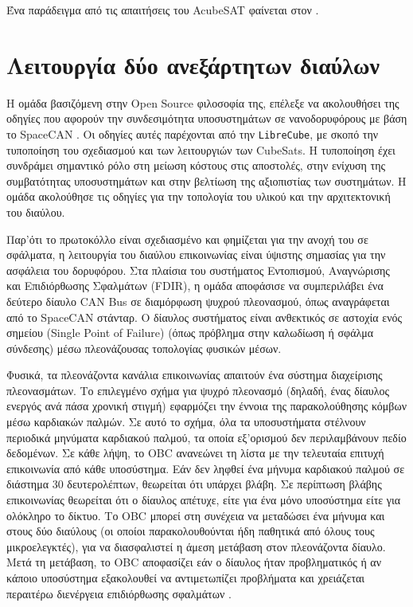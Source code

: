 \documentclass[a4paper,nobib,justified]{tufte-book}
\begin{document}
Ένα παράδειγμα από τις απαιτήσεις του AcubeSAT φαίνεται στον .

\section{Λειτουργία δύο ανεξάρτητων διαύλων}
Η ομάδα βασιζόμενη στην Open Source φιλοσοφία της, επέλεξε να ακολουθήσει της οδηγίες που αφορούν την συνδεσιμότητα υποσυστημάτων σε νανοδορυφόρους με βάση το SpaceCAN . Οι οδηγίες αυτές παρέχονται από την \texttt{LibreCube}, με σκοπό την τυποποίηση του σχεδιασμού και των λειτουργιών των CubeSats. Η τυποποίηση έχει συνδράμει σημαντικό ρόλο στη μείωση κόστους στις αποστολές, στην ενίχυση της συμβατότητας υποσυστημάτων και στην βελτίωση της αξιοπιστίας των συστημάτων. Η ομάδα ακολούθησε τις οδηγίες για την τοπολογία του υλικού και την αρχιτεκτονική του διαύλου.

Παρ'ότι το πρωτοκόλλο είναι σχεδιασμένο και φημίζεται για την ανοχή του σε σφάλματα, η λειτουργία του διαύλου επικοινωνίας είναι ύψιστης σημασίας για την ασφάλεια του δορυφόρου. Στα πλαίσια του συστήματος Εντοπισμού, Αναγνώρισης και Επιδιόρθωσης Σφαλμάτων (FDIR), η ομάδα αποφάσισε να συμπεριλάβει ένα δεύτερο δίαυλο CAN Bus σε διαμόρφωση ψυχρού πλεονασμού, όπως αναγράφεται από το SpaceCAN  στάνταρ. Ο δίαυλος συστήματος είναι ανθεκτικός σε αστοχία ενός σημείου (Single Point of Failure) (όπως πρόβλημα στην καλωδίωση ή σφάλμα σύνδεσης) μέσω πλεονάζουσας τοπολογίας φυσικών μέσων. 

Φυσικά, τα πλεονάζοντα κανάλια επικοινωνίας απαιτούν ένα σύστημα διαχείρισης πλεονασμάτων. Το επιλεγμένο σχήμα για ψυχρό πλεονασμό (δηλαδή, ένας δίαυλος ενεργός ανά πάσα χρονική στιγμή) εφαρμόζει την έννοια της παρακολούθησης κόμβων μέσω καρδιακών παλμών. Σε αυτό το σχήμα, όλα τα υποσυστήματα στέλνουν περιοδικά μηνύματα καρδιακού παλμού, τα οποία εξ'ορισμού δεν περιλαμβάνουν πεδίο δεδομένων. Σε κάθε λήψη, το OBC ανανεώνει τη λίστα με την τελευταία επιτυχή επικοινωνία από κάθε υποσύστημα. Εάν δεν ληφθεί ένα μήνυμα καρδιακού παλμού σε διάστημα 30 δευτερολέπτων, θεωρείται ότι υπάρχει βλάβη. Σε περίπτωση βλάβης επικοινωνίας θεωρείται ότι ο δίαυλος απέτυχε, είτε για ένα μόνο υποσύστημα είτε για ολόκληρο το δίκτυο. Το OBC μπορεί στη συνέχεια να μεταδώσει ένα μήνυμα και στους δύο διαύλους (οι οποίοι παρακολουθούνται ήδη παθητικά από όλους τους μικροελεγκτές), για να διασφαλιστεί η άμεση μετάβαση στον πλεονάζοντα δίαυλο. Μετά τη μετάβαση, το OBC αποφασίζει εάν ο δίαυλος ήταν προβληματικός ή αν κάποιο υποσύστημα εξακολουθεί να αντιμετωπίζει προβλήματα και χρειάζεται περαιτέρω διενέργεια επιδιόρθωσης σφαλμάτων .
\end{document}
